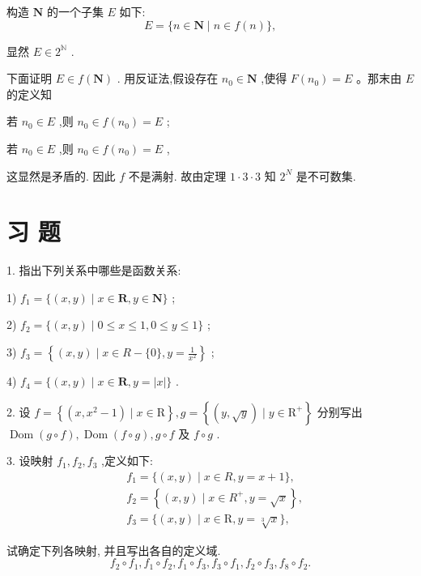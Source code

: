 构造 $\mathbf{N}$ 的一个子集 $E$ 如下:
$$E = \{ n \in  \mathbf{N} \mid  n \in  f\left( n\right) \} ,$$

显然 $E \in  {2}^{\mathbb{N}}$ .

下面证明 $E \in  f\left( \mathbf{N}\right)$ . 用反证法,假设存在 ${n}_{0} \in  \mathbf{N}$ ,使得 $F\left( {n}_{0}\right)  = E$ 。那末由 $E$ 的定义知

若 ${n}_{0} \in  E$ ,则 ${n}_{0} \in  f\left( {n}_{0}\right)  = E$ ;

若 ${n}_{0} \in  E$ ,则 ${n}_{0} \in  f\left( {n}_{0}\right)  = E$ ,

这显然是矛盾的. 因此 $f$ 不是满射. 故由定理 $1 \cdot  3 \cdot  3$ 知 ${2}^{N}$ 是不可数集.

\section*{习 题}

1. 指出下列关系中哪些是函数关系:

1) ${f}_{1} = \{ \left( {x,y}\right)  \mid  x \in  \mathbf{R},y \in  \mathbf{N}\}$ ;

2) ${f}_{2} = \{ \left( {x,y}\right)  \mid  0 \leq  x \leq  1,0 \leq  y \leq  1\}$ ;

3) ${f}_{3} = \left\{  {\left( {x,y}\right)  \mid  x \in  R-\{ 0\} ,y = \frac{1}{{x}^{2}}}\right\}$ ;

4) ${f}_{4} = \{ \left( {x,y}\right)  \mid  x \in  \mathbf{R},y = \left| x\right| \}$ .

2. 设 $f = \left\{  {\left( {x,{x}^{2} - 1}\right)  \mid  x \in  \mathrm{R}}\right\}  ,g = \left\{  {\left( {y,\sqrt{y}}\right)  \mid  y \in  {\mathrm{R}}^{ + }}\right\}$ 分别写出 $\operatorname{Dom}\left( {g \circ  f}\right) ,\operatorname{Dom}\left( {f \circ  g}\right) ,g \circ  f$ 及 $f \circ  g$ .

3. 设映射 ${f}_{1},{f}_{2},{f}_{3}$ ,定义如下:
\begin{align*}
	&{f}_{1} = \{ \left( {x,y}\right)  \mid  x \in  R,y = x + 1\} ,\\
	&{f}_{2} = \left\{  {\left( {x,y}\right)  \mid  x \in  {R}^{ + },y = \sqrt{x}}\right\}  ,\\
	&{f}_{3} = \{ \left( {x,y}\right)  \mid  x \in  \mathrm{R},y = \sqrt[3]{x}\} ,
\end{align*}

试确定下列各映射, 并且写出各自的定义域.
$${f}_{2} \circ  {f}_{1},{f}_{1} \circ  {f}_{2},{f}_{1} \circ  {f}_{3},{f}_{3} \circ  {f}_{1},{f}_{2} \circ  {f}_{3},{f}_{8} \circ  {f}_{2}.$$


